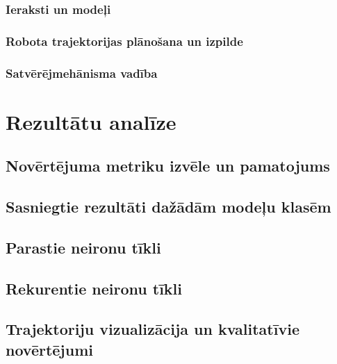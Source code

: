 \documentclass[12pt, a4paper]{article}
\numberwithin{equation}{section} %
\begin{document}
\subsubsection{Ieraksti un modeļi}

\subsubsection{Robota trajektorijas plānošana un izpilde}

\subsubsection{Satvērējmehānisma vadība}


%
%
%
%
%
%
%
%
%
%
%
%
%
%
%
%
%
%
%

\newpage
\section{Rezultātu analīze}

\subsection{Novērtējuma metriku izvēle un pamatojums}

\subsection{Sasniegtie rezultāti dažādām modeļu klasēm}

\subsection{Parastie neironu tīkli}

\subsection{Rekurentie neironu tīkli}

\subsection{Trajektoriju vizualizācija un kvalitatīvie novērtējumi}


%
%
%
%
%
%
%
%
%
%
%
%
%
%
%
%
%
%
%
\end{document}
